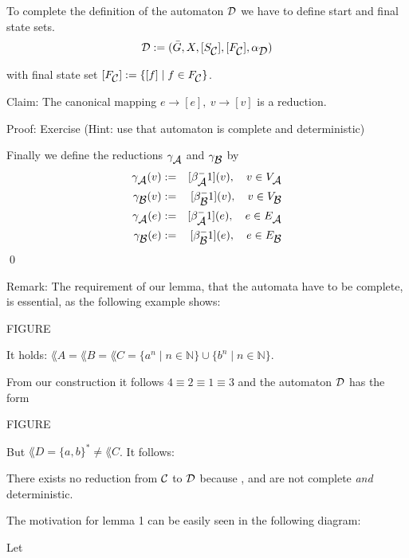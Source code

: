 To complete the definition of the automaton $\mbox{$\mathcal{D}$}$ we have to define start and
final state sets.
\[ \mbox{$\mathcal{D}$} := (\bar{G}, X, [S_{\mbox{$\mathcal{C}$}}], [F_{\mbox{$\mathcal{C}$}}], \alpha_{\mbox{$\mathcal{D}$}}) \]

with final state set $[F_{\mbox{$\mathcal{C}$}}] := \{ [f] \mid f \in F_{\mbox{$\mathcal{C}$}} \}$.

Claim: The canonical mapping $e \to [e],\ v \to [v]$ is a reduction.

Proof: Exercise (Hint: use that automaton is complete and deterministic)

Finally we define the reductions $\gamma_{\mbox{$\mathcal{A}$}}$ and $\gamma_{\mbox{$\mathcal{B}$}}$ by
\begin{eqnarray*}
\gamma_{\mbox{$\mathcal{A}$}}(v) & := & [\beta_{\mbox{$\mathcal{A}$}}^-1](v),\quad v \in V_{\mbox{$\mathcal{A}$}} \\
\gamma_{\mbox{$\mathcal{B}$}}(v) & := & [\beta_{\mbox{$\mathcal{B}$}}^-1](v),\quad v \in V_{\mbox{$\mathcal{B}$}} \\
\gamma_{\mbox{$\mathcal{A}$}}(e) & := & [\beta_{\mbox{$\mathcal{A}$}}^-1](e),\quad e \in E_{\mbox{$\mathcal{A}$}} \\
\gamma_{\mbox{$\mathcal{B}$}}(e) & := & [\beta_{\mbox{$\mathcal{B}$}}^-1](e),\quad e \in E_{\mbox{$\mathcal{B}$}} \\
\end{eqnarray*}
\qed

Remark: The requirement of our lemma, that the automata have to be complete, is
essential, as the following example shows:

FIGURE

It holds: $\lang{A} = \lang{B} = \lang{C} = \{ a^n \mid n \in \mathbb{N} \}
\cup \{ b^n \mid n \in \mathbb{N} \}$.

From our construction it follows $4 \equiv 2 \equiv 1 \equiv 3$ and the
automaton $\mbox{$\mathcal{D}$}$ has the form

FIGURE

But $\lang{D} = \{ a, b \}^* \neq \lang{C}$. It follows:

There exists no reduction from $\mbox{$\mathcal{C}$}$ to $\mbox{$\mathcal{D}$}$ because ,  and
 are not complete {\it and} deterministic.

The motivation for lemma 1 can be easily seen in the following diagram:

Let

\begin{center}
\end{center}

